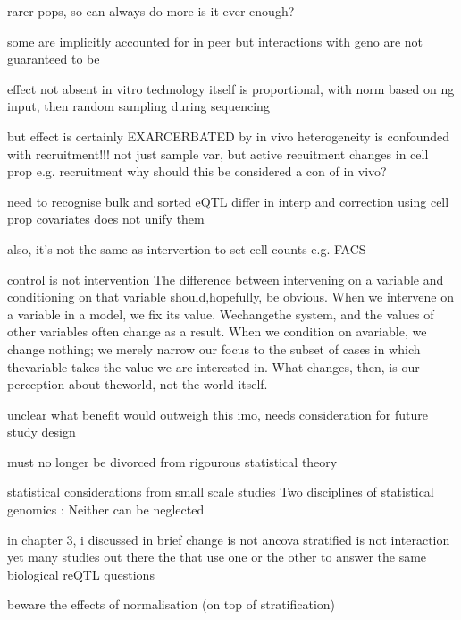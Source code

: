 \begin{outline}
        rarer pops, so can always do more
        is it ever enough?

    some are implicitly accounted for in peer
        but interactions with geno are not guaranteed to be

    effect not absent in vitro
        technology itself is proportional, with norm based on ng input, then random sampling during sequencing

    but effect is certainly EXARCERBATED by in vivo
        heterogeneity is confounded with recruitment!!!
        not just sample var, but active recuitment changes in cell prop e.g. recruitment
            why should this be considered a con of in vivo?

    need to recognise 
        bulk and sorted eQTL differ in interp
            and correction using cell prop covariates does not unify them

        also, it's not the same as intervertion to set cell counts e.g. FACS

            control is not intervention
                The difference between intervening on a variable and conditioning on that
                variable should,hopefully, be obvious. When we intervene on a variable in a
                model, we fix its value. Wechangethe system, and the values of other variables
                often change as a result. When we condition on avariable, we change nothing; we
                merely narrow our focus to the subset of cases in which thevariable takes the
                value we are interested in. What changes, then, is our perception about
                theworld, not the world itself.

    unclear what benefit would outweigh this
        imo, needs consideration for future study design

    must no longer be divorced from rigourous statistical theory

        statistical considerations from small scale studies
            Two disciplines of statistical genomics : Neither can be neglected

            in chapter 3, i discussed in brief
                change is not ancova
                stratified is not interaction
                yet many studies out there the that use one or the other to answer the same biological reQTL questions

        beware the effects of normalisation (on top of stratification)


\end{outline}
